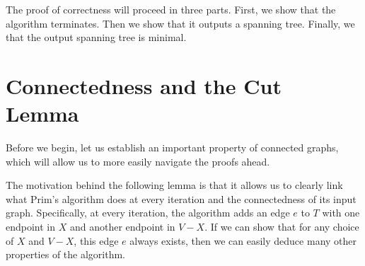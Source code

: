 \documentclass[a4paper,11pt]{report}
\theoremstyle{plain}
\theoremstyle{definition}
\begin{document}
The proof of correctness will proceed in three parts. First, we show that the
algorithm terminates. Then we show that it outputs a spanning tree. Finally,
we that the output spanning tree is minimal.

\section{Connectedness and the Cut Lemma}

Before we begin, let us establish an important property of connected graphs,
which will allow us to more easily navigate the proofs ahead.

The motivation behind the following lemma is that it allows us to clearly
link what Prim's algorithm does at every iteration and the connectedness of its
input graph. Specifically, at every iteration, the algorithm adds an edge $e$
to $T$ with one endpoint in $X$ and another endpoint in $V - X$. If we can show
that for any choice of $X$ and $V - X$, this edge $e$ always exists, then
we can easily deduce many other properties of the algorithm.
\end{document}
